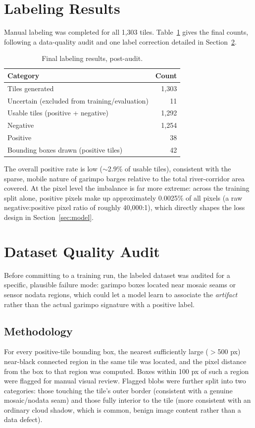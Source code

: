 \documentclass[11pt,a4paper]{article}
\begin{document}
\section{Labeling Results}

Manual labeling was completed for all 1,303 tiles. Table~\ref{tab:labels}
gives the final counts, following a data-quality audit and one label
correction detailed in Section~\ref{sec:audit}.

\begin{table}[htbp]
\centering
\caption{Final labeling results, post-audit.}
\label{tab:labels}
\begin{tabular}{lr}
\toprule
\textbf{Category} & \textbf{Count} \\
\midrule
Tiles generated & 1,303 \\
Uncertain (excluded from training/evaluation) & 11 \\
Usable tiles (positive + negative) & 1,292 \\
Negative & 1,254 \\
Positive & 38 \\
Bounding boxes drawn (positive tiles) & 42 \\
\bottomrule
\end{tabular}
\end{table}

The overall positive rate is low ($\sim$2.9\% of usable tiles), consistent
with the sparse, mobile nature of garimpo barges relative to the total
river-corridor area covered. At the pixel level the imbalance is far more
extreme: across the training split alone, positive pixels make up
approximately 0.0025\% of all pixels (a raw negative:positive pixel ratio of
roughly 40{,}000:1), which directly shapes the loss design in
Section~\ref{sec:model}.

\section{Dataset Quality Audit}
\label{sec:audit}

Before committing to a training run, the labeled dataset was audited for a
specific, plausible failure mode: garimpo boxes located near mosaic seams or
sensor nodata regions, which could let a model learn to associate the
\emph{artifact} rather than the actual garimpo signature with a positive
label.

\subsection{Methodology}
For every positive-tile bounding box, the nearest sufficiently large
($>$500 px) near-black connected region in the same tile was located, and the
pixel distance from the box to that region was computed. Boxes within 100 px
of such a region were flagged for manual visual review. Flagged blobs were
further split into two categories: those touching the tile's outer border
(consistent with a genuine mosaic/nodata seam) and those fully interior to
the tile (more consistent with an ordinary cloud shadow, which is common,
benign image content rather than a data defect).
\end{document}
